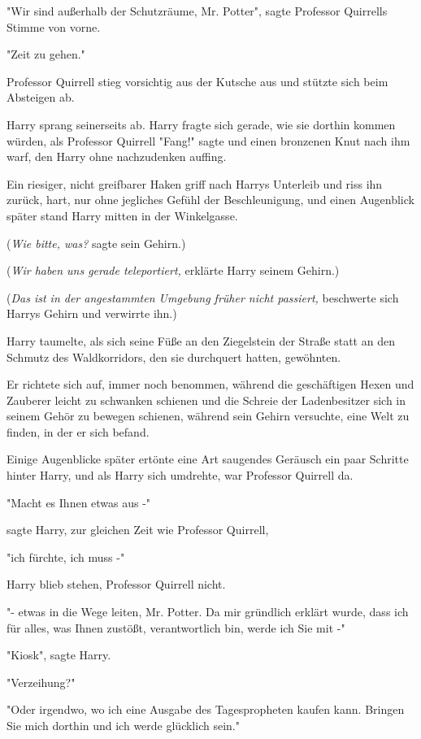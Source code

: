 {"Wir sind außerhalb der Schutzräume, Mr. Potter", sagte Professor Quirrells Stimme von vorne.

"Zeit zu gehen."

Professor Quirrell stieg vorsichtig aus der Kutsche aus und stützte sich beim Absteigen ab.

Harry sprang seinerseits ab. Harry fragte sich gerade, wie sie dorthin kommen würden, als Professor Quirrell "Fang!" sagte und einen bronzenen Knut nach ihm warf, den Harry ohne nachzudenken auffing.

Ein riesiger, nicht greifbarer Haken griff nach Harrys Unterleib und riss ihn zurück, hart, nur ohne jegliches Gefühl der Beschleunigung, und einen Augenblick später stand Harry mitten in der Winkelgasse.

(\emph{Wie bitte, was?} sagte sein Gehirn.)

(\emph{Wir haben uns gerade teleportiert,} erklärte Harry seinem Gehirn.)

(\emph{Das ist in der angestammten Umgebung früher nicht passiert,} beschwerte sich Harrys Gehirn und verwirrte ihn.)

Harry taumelte, als sich seine Füße an den Ziegelstein der Straße statt an den Schmutz des Waldkorridors, den sie durchquert hatten, gewöhnten.

Er richtete sich auf, immer noch benommen, während die geschäftigen Hexen und Zauberer leicht zu schwanken schienen und die Schreie der Ladenbesitzer sich in seinem Gehör zu bewegen schienen, während sein Gehirn versuchte, eine Welt zu finden, in der er sich befand.

Einige Augenblicke später ertönte eine Art saugendes Geräusch ein paar Schritte hinter Harry, und als Harry sich umdrehte, war Professor Quirrell da.

"Macht es Ihnen etwas aus -"

sagte Harry, zur gleichen Zeit wie Professor Quirrell,

"ich fürchte, ich muss -"

Harry blieb stehen, Professor Quirrell nicht.

"- etwas in die Wege leiten, Mr. Potter. Da mir gründlich erklärt wurde, dass ich für alles, was Ihnen zustößt, verantwortlich bin, werde ich Sie mit -"

"Kiosk", sagte Harry.

"Verzeihung?"

"Oder irgendwo, wo ich eine Ausgabe des Tagespropheten kaufen kann. Bringen Sie mich dorthin und ich werde glücklich sein."

}
